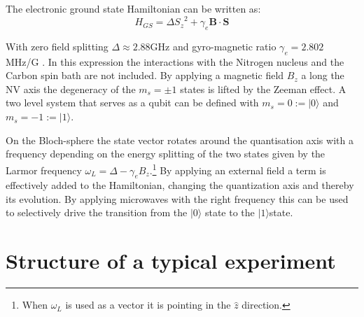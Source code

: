 The electronic ground state Hamiltonian can be written as\cite{Pfaff2013Quantum}:
 \begin{equation}
H_{GS} = \Delta {S_z}^2 + \gamma_e \mathbf{B} \cdot \mathbf{S}
\end{equation}

With zero field splitting $\Delta \approx 2.88 \mathrm{GHz}$  and gyro-magnetic ratio $\gamma_e  = 2.802$ MHz/G . In this expression the interactions with the Nitrogen nucleus and the Carbon spin bath are not included. By applying a magnetic field $B_z$ a long the NV axis the degeneracy of the  $m_s =\pm1$ states is lifted by the Zeeman effect. A two level system that serves as a qubit can be defined with  $m_s=0:=|0\rangle$ and $m_s = -1 := |1\rangle$.

On the Bloch-sphere the state vector rotates around the quantisation axis with a frequency depending on the energy splitting of the two states given by the Larmor frequency  $\omega_L =\Delta - \gamma_e {B_z} $.\footnote{When  $\omega_L$  is used as a vector it is pointing in the $\hat{z}$ direction.} By applying an external field a term is effectively added to the Hamiltonian, changing the quantization axis and thereby its evolution. By applying microwaves with the right frequency this can be used to selectively drive the transition from the  $|0\rangle$ state to the $|1\rangle$state\cite{Jelezko2004Observation}.


\section{Structure of a typical experiment}




